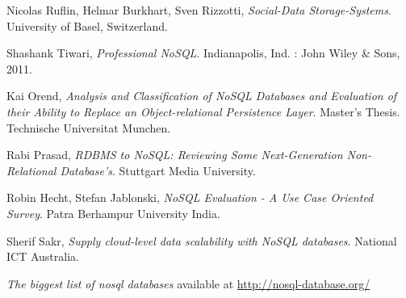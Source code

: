 \documentclass[times, 10pt,twocolumn]{article}
\begin{document}
\begin{thebibliography}{9}
  	  Nicolas Ruﬂin, Helmar Burkhart, Sven Rizzotti, 
      \emph{Social-Data Storage-Systems}.  University of Basel, Switzerland.
      
  	  Shashank Tiwari, 
      \emph{Professional NoSQL}. Indianapolis, Ind. : John Wiley \& Sons, 2011.
      
  	  Kai Orend, 
      \emph{Analysis and Classification of NoSQL Databases and Evaluation of their Ability to Replace an Object-relational Persistence Layer}. Master's Thesis. Technische Universitat Munchen.
      
  	  Rabi Prasad, 
      \emph{RDBMS to NoSQL: Reviewing Some Next-Generation Non-Relational Database's}. Stuttgart Media University.
      
  	  Robin Hecht, Stefan Jablonski,
      \emph{NoSQL Evaluation - A Use Case Oriented Survey}. Patra Berhampur University India.
       
  	  Sherif Sakr, 
      \emph{Supply cloud-level data scalability with NoSQL databases}. National ICT Australia.
      
      \emph{The biggest list of nosql databases} available at
      \url{http://nosql-database.org/}

\end{thebibliography}
\end{document}
